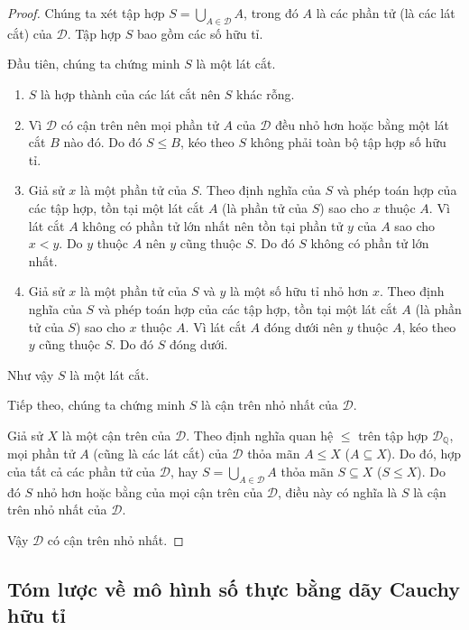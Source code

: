 \begin{proof}
    Chúng ta xét tập hợp $S = \bigcup\limits_{A\in\mathscr{D}} A$, trong đó $A$ là các phần tử (là các lát cắt) của $\mathscr{D}$. Tập hợp $S$ bao gồm các số hữu tỉ.

    Đầu tiên, chúng ta chứng minh $S$ là một lát cắt.
    \begin{enumerate}[label={(DC\arabic*)}, itemindent=0.2cm]
        \item $S$ là hợp thành của các lát cắt nên $S$ khác rỗng.
        \item Vì $\mathscr{D}$ có cận trên nên mọi phần tử $A$ của $\mathscr{D}$ đều nhỏ hơn hoặc bằng một lát cắt $B$ nào đó. Do đó $S\leq B$, kéo theo $S$ không phải toàn bộ tập hợp số hữu tỉ.
        \item Giả sử $x$ là một phần tử của $S$. Theo định nghĩa của $S$ và phép toán hợp của các tập hợp, tồn tại một lát cắt $A$ (là phần tử của $S$) sao cho $x$ thuộc $A$. Vì lát cắt $A$ không có phần tử lớn nhất nên tồn tại phần tử $y$ của $A$ sao cho $x < y$. Do $y$ thuộc $A$ nên $y$ cũng thuộc $S$. Do đó $S$ không có phần tử lớn nhất.
        \item Giả sử $x$ là một phần tử của $S$ và $y$ là một số hữu tỉ nhỏ hơn $x$.  Theo định nghĩa của $S$ và phép toán hợp của các tập hợp, tồn tại một lát cắt $A$ (là phần tử của $S$) sao cho $x$ thuộc $A$. Vì lát cắt $A$ đóng dưới nên $y$ thuộc $A$, kéo theo $y$ cũng thuộc $S$. Do đó $S$ đóng dưới.
    \end{enumerate}

    Như vậy $S$ là một lát cắt.

    Tiếp theo, chúng ta chứng minh $S$ là cận trên nhỏ nhất của $\mathscr{D}$.

    Giả sử $X$ là một cận trên của $\mathscr{D}$. Theo định nghĩa quan hệ $\leq$ trên tập hợp $\mathscr{D}_{\mathbb{Q}}$, mọi phần tử $A$ (cũng là các lát cắt) của $\mathscr{D}$ thỏa mãn $A\leq X$ ($A\subseteq X$). Do đó, hợp của tất cả các phần tử của $\mathscr{D}$, hay $S = \bigcup\limits_{A\in\mathscr{D}} A$ thỏa mãn $S\subseteq X$ ($S\leq X$). Do đó $S$ nhỏ hơn hoặc bằng của mọi cận trên của $\mathscr{D}$, điều này có nghĩa là $S$ là cận trên nhỏ nhất của $\mathscr{D}$.

    Vậy $\mathscr{D}$ có cận trên nhỏ nhất.
\end{proof}

\subsection{Tóm lược về mô hình số thực bằng dãy Cauchy hữu tỉ}

